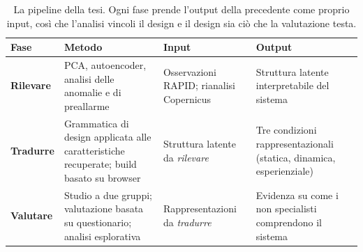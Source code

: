 \begin{table}[!ht]
    \centering
    \small
    \renewcommand{\arraystretch}{1.3}
    \caption[Il workflow rilevare--tradurre--valutare.]{La pipeline della tesi. Ogni
    fase prende l'output della precedente come proprio input, così che l'analisi
    vincoli il design e il design sia ciò che la valutazione testa.}
    \label{tab:workflow}
    \begin{tabular}{@{}>{\raggedright\arraybackslash}p{2.3cm}>{\raggedright\arraybackslash}p{3.5cm}>{\raggedright\arraybackslash}p{3.2cm}>{\raggedright\arraybackslash}p{3.2cm}@{}}
        \toprule
        \textbf{Fase} & \textbf{Metodo} & \textbf{Input} & \textbf{Output} \\
        \midrule
        \textbf{Rilevare}
            & PCA, autoencoder, analisi delle anomalie e di preallarme
            & Osservazioni RAPID; rianalisi Copernicus
            & Struttura latente interpretabile del sistema \\
        \textbf{Tradurre}
            & Grammatica di design applicata alle caratteristiche recuperate; build basato su browser
            & Struttura latente da \emph{rilevare}
            & Tre condizioni rappresentazionali (statica, dinamica, esperienziale) \\
        \textbf{Valutare}
            & Studio a due gruppi; valutazione basata su questionario; analisi esplorativa
            & Rappresentazioni da \emph{tradurre}
            & Evidenza su come i non specialisti comprendono il sistema \\
        \bottomrule
    \end{tabular}
\end{table}
